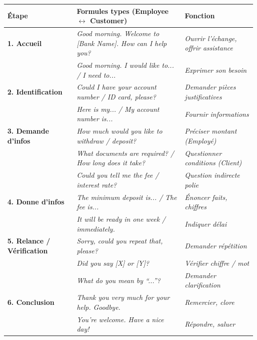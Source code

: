 \documentclass[11pt]{article}
\newcommand{\eng}[1]{\ifmmode\text{\textit{#1}}\else\begingroup\selectlanguage{english}\itshape #1\endgroup\fi}
\begin{document}
\begin{propriete}
\begin{center}
\begin{tabularx}{\linewidth}{|l|X|X|}
\hline
\rowcolor{popblueL}
\textbf{Étape} & \textbf{Formules types (Employee $\leftrightarrow$ Customer)} & \textbf{Fonction} \\
\hline
\textbf{1. Accueil} & \eng{Good morning. Welcome to [Bank Name]. How can I help you?} & \textit{Ouvrir l'échange, offrir assistance} \\
& \eng{Good morning. I would like to... / I need to...} & \textit{Exprimer son besoin} \\
\hline
\textbf{2. Identification} & \eng{Could I have your account number / ID card, please?} & \textit{Demander pièces justificatives} \\
& \eng{Here is my... / My account number is...} & \textit{Fournir informations} \\
\hline
\textbf{3. Demande d'infos} & \eng{How much would you like to withdraw / deposit?} & \textit{Préciser montant (Employé)} \\
& \eng{What documents are required? / How long does it take?} & \textit{Questionner conditions (Client)} \\
& \eng{Could you tell me the fee / interest rate?} & \textit{Question indirecte polie} \\
\hline
\textbf{4. Donne d'infos} & \eng{The minimum deposit is... / The fee is...} & \textit{Énoncer faits, chiffres} \\
& \eng{It will be ready in one week / immediately.} & \textit{Indiquer délai} \\
\hline
\textbf{5. Relance / Vérification} & \eng{Sorry, could you repeat that, please?} & \textit{Demander répétition} \\
& \eng{Did you say [X] or [Y]?} & \textit{Vérifier chiffre / mot} \\
& \eng{What do you mean by “...”?} & \textit{Demander clarification} \\
\hline
\textbf{6. Conclusion} & \eng{Thank you very much for your help. Goodbye.} & \textit{Remercier, clore} \\
& \eng{You're welcome. Have a nice day!} & \textit{Répondre, saluer} \\
\hline
\end{tabularx}
\end{center}
\end{propriete}
\end{document}
